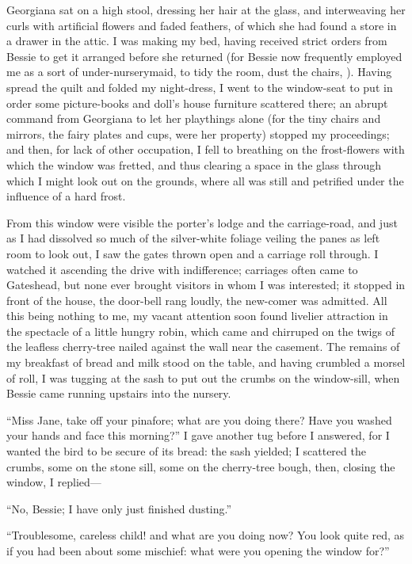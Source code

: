 Georgiana sat on a high stool, dressing her hair at the glass, and
interweaving her curls with artificial flowers and faded feathers, of
which she had found a store in a drawer in the attic. I was making my
bed, having received strict orders from Bessie to get it arranged before
she returned (for Bessie now frequently employed me as a sort of
under-nurserymaid, to tidy the room, dust the chairs, \etc). Having
spread the quilt and folded my night-dress, I went to the window-seat to
put in order some picture-books and doll's house furniture scattered
there; an abrupt command from Georgiana to let her playthings alone (for
the tiny chairs and mirrors, the fairy plates and cups, were her
property) stopped my proceedings; and then, for lack of other
occupation, I fell to breathing on the frost-flowers with which the
window was fretted, and thus clearing a space in the glass through which
I might look out on the grounds, where all was still and petrified under
the influence of a hard frost.

From this window were visible the porter's lodge and the carriage-road,
and just as I had dissolved so much of the silver-white foliage veiling
the panes as left room to look out, I saw the gates thrown open and a
carriage roll through. I watched it ascending the drive with
indifference; carriages often came to Gateshead, but none ever brought
visitors in whom I was interested; it stopped in front of the house, the
door-bell rang loudly, the new-comer was admitted. All this being
nothing to me, my vacant attention soon found livelier attraction in the
spectacle of a little hungry robin, which came and chirruped on the
twigs of the leafless cherry-tree nailed against the wall near the
casement. The remains of my breakfast of bread and milk stood on the
table, and having crumbled a morsel of roll, I was tugging at the sash
to put out the crumbs on the window-sill, when Bessie came running
upstairs into the nursery.

\enquote{Miss Jane, take off your pinafore; what are you doing there?
	Have you washed your hands and face this morning?} I gave another tug
before I answered, for I wanted the bird to be secure of its bread: the
sash yielded; I scattered the crumbs, some on the stone sill, some on
the cherry-tree bough, then, closing the window, I replied---

\enquote{No, Bessie; I have only just finished dusting.}

\enquote{Troublesome, careless child! and what are you doing now? You
	look quite red, as if you had been about some mischief: what were you
	opening the window for?}

